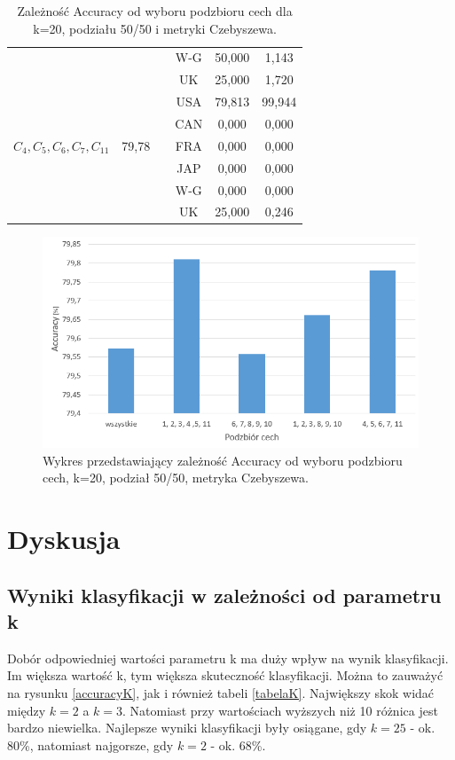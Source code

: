 \documentclass{classrep}
\begin{document}
\begin{table}[h!]
\begin{tabular} {c c c c c c}
		&												&\vline& W-G & 50,000 & 1,143 \\
		&		 										&\vline& UK  & 25,000 & 1,720 \\
		\hline 
		&   										&\vline& USA & 79,813 & 99,944 \\
		&											&\vline& CAN & 0,000 & 0,000 \\
		$C_4, C_5, C_6, C_7, C_{11}$ & 79,78        &\vline& FRA & 0,000 & 0,000 \\
		&											&\vline& JAP & 0,000 & 0,000 \\
		&											&\vline& W-G & 0,000 & 0,000 \\
		&		 									&\vline& UK  & 25,000 & 0,246 \\
		\hline 
		\hline
	\end{tabular}
	\caption{Zależność Accuracy od wyboru podzbioru cech dla k=20, podziału 50/50 i metryki Czebyszewa. }
	\label{tabelaFeatures}
\end{table}

\begin{figure}[h!]
    \centering
    \includegraphics[width=1\textwidth]{accuracyFeatures.png}
    \caption{Wykres przedstawiający zależność Accuracy od wyboru podzbioru cech, k=20, podział 50/50, metryka Czebyszewa.}
    \label{accuracyFeatures}
\end{figure}

\newpage
\section{Dyskusja} %
\subsection{Wyniki klasyfikacji w zależności od parametru k}
Dobór odpowiedniej wartości parametru k ma duży wpływ na wynik klasyfikacji. Im większa wartość k, tym większa skuteczność klasyfikacji. Można to zauważyć na rysunku \ref{accuracyK}, jak i również tabeli \ref{tabelaK}. Największy skok widać między $k=2$ a $k=3$. Natomiast przy wartościach wyższych niż 10 różnica jest bardzo niewielka. Najlepsze wyniki klasyfikacji były osiągane, gdy $k=25$ - ok. 80\%, natomiast najgorsze, gdy $k=2$ - ok. 68\%. 
\end{document}
